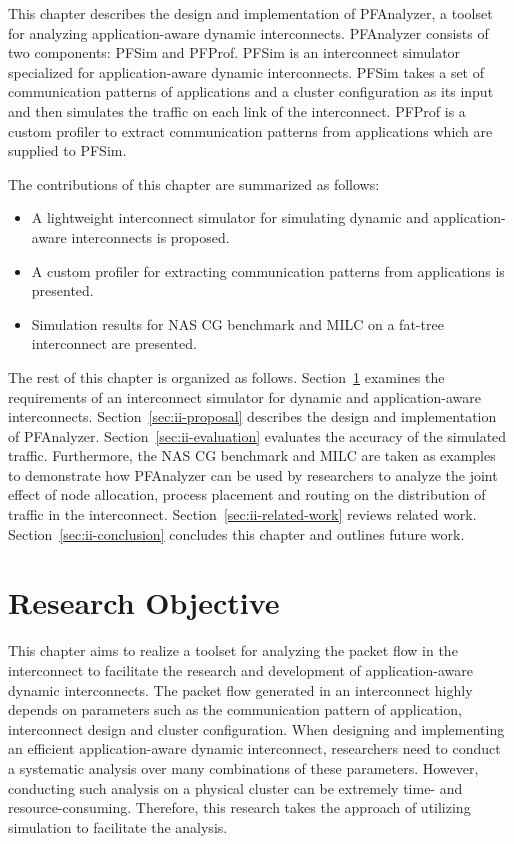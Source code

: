 This chapter describes the design and implementation of PFAnalyzer, a
toolset for analyzing application-aware dynamic interconnects.
PFAnalyzer consists of two components: PFSim and PFProf. PFSim is an
interconnect simulator specialized for application-aware dynamic
interconnects. PFSim takes a set of communication patterns of
applications and a cluster configuration as its input and then simulates
the traffic on each link of the interconnect. PFProf is a custom profiler to
extract communication patterns from applications which are supplied to PFSim.

The contributions of this chapter are summarized as follows:

\begin{itemize}
\item
  A lightweight interconnect simulator for simulating dynamic and
  application-aware interconnects is proposed.
\item
  A custom profiler for extracting communication patterns from
  applications is presented.
\item
  Simulation results for NAS CG benchmark and MILC on a fat-tree
  interconnect are presented.
\end{itemize}

The rest of this chapter is organized as follows.
Section~\ref{sec:ii-objective} examines the requirements of an
interconnect simulator for dynamic and application-aware interconnects.
Section~\ref{sec:ii-proposal} describes the design and implementation of
PFAnalyzer. Section~\ref{sec:ii-evaluation} evaluates the accuracy of the
simulated traffic. Furthermore, the NAS CG benchmark and MILC are taken as
examples to demonstrate how PFAnalyzer can be used by researchers to analyze
the joint effect of node allocation, process placement and routing on the
distribution of traffic in the interconnect. Section~\ref{sec:ii-related-work}
reviews related work. Section~\ref{sec:ii-conclusion} concludes this chapter
and outlines future work.

\section{Research Objective}\label{sec:ii-objective}

This chapter aims to realize a toolset for analyzing the packet flow in the
interconnect to facilitate the research and development of application-aware
dynamic interconnects. The packet flow generated in an interconnect highly
depends on parameters such as the communication pattern of application,
interconnect design and cluster configuration. When designing and implementing
an efficient application-aware dynamic interconnect, researchers need to
conduct a systematic analysis over many combinations of these parameters.
However, conducting such analysis on a physical cluster can be extremely time-
and resource-consuming. Therefore, this research takes the approach of
utilizing simulation to facilitate the analysis.

